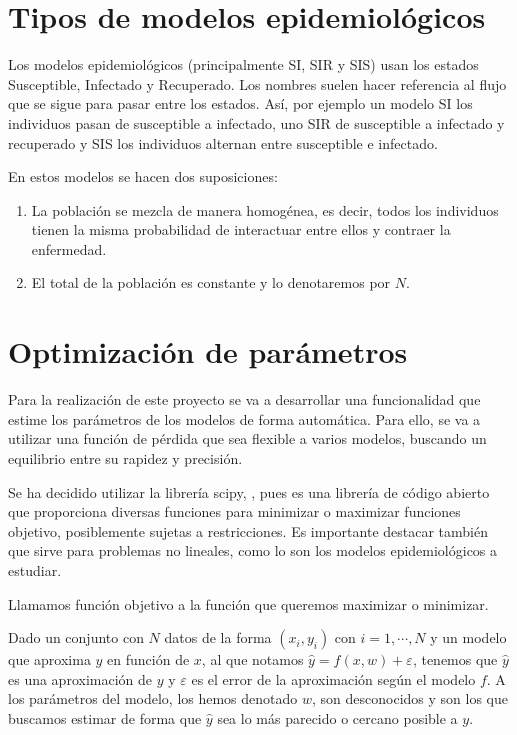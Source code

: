 \section{Tipos de modelos epidemiológicos}

Los modelos epidemiológicos (principalmente SI, SIR y SIS) usan los estados Susceptible, Infectado y Recuperado. Los nombres suelen hacer referencia al flujo que se sigue para pasar entre los estados. Así, por ejemplo un modelo SI los individuos pasan de susceptible a infectado, uno SIR de susceptible a infectado y recuperado y SIS los individuos alternan entre susceptible e infectado.

En estos modelos se hacen dos suposiciones:
\begin{enumerate}
\item La población se mezcla de manera homogénea, es decir, todos los individuos tienen la misma probabilidad de interactuar entre ellos y contraer la enfermedad.
\item El total de la población es constante y lo denotaremos por $N$.
\end{enumerate}

\section{Optimización de parámetros}

Para la realización de este proyecto se va a desarrollar una funcionalidad que estime los parámetros de los modelos de forma automática. Para ello, se va a utilizar una función de pérdida que sea flexible a varios modelos, buscando un equilibrio entre su rapidez y precisión.

Se ha decidido utilizar la librería scipy, \cite{scipy}, pues es una librería de código abierto que proporciona diversas funciones para minimizar o maximizar funciones objetivo, posiblemente sujetas a restricciones. Es importante destacar también que sirve para problemas no lineales, como lo son los modelos epidemiológicos a estudiar.

\begin{definition}
Llamamos función objetivo a la función que queremos maximizar o minimizar.
\end{definition}

Dado un conjunto con $N$ datos de la forma $(x_i,y_i)$ con $i=1,\cdots,N$ y un modelo que aproxima $y$ en función de $x$, al que notamos $\hat{y}=f(x,w)+\varepsilon$, tenemos que $\hat{y}$ es una aproximación de $y$ y $\varepsilon$ es el error de la aproximación según el modelo $f$. A los parámetros del modelo, los hemos denotado $w$, son desconocidos y son los que buscamos estimar de forma que $\hat{y}$ sea lo más parecido o cercano posible a $y$.


